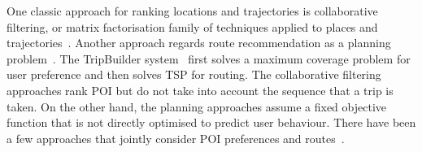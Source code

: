 One classic approach for ranking locations and trajectories is collaborative filtering, 
or matrix factorisation family of techniques applied to places and trajectories~\cite{shi2011personalized,zhang2015location,ijcai13}.
Another approach regards route recommendation as a planning problem~\cite{gioniswsdm14,ijcai15}.
The TripBuilder system~\cite{brilhante2013shall} first solves a maximum coverage problem for user preference and then solves TSP for routing. 
The collaborative filtering approaches rank POI but do not take into account the sequence that a trip is taken. 
On the other hand, the planning approaches assume a fixed objective function that is not directly optimised to predict user behaviour. 
There have been a few approaches that jointly consider POI preferences and routes~\cite{chen2015tripplanner,kurashima2010geotag,kurashima2010geotag}.



%


